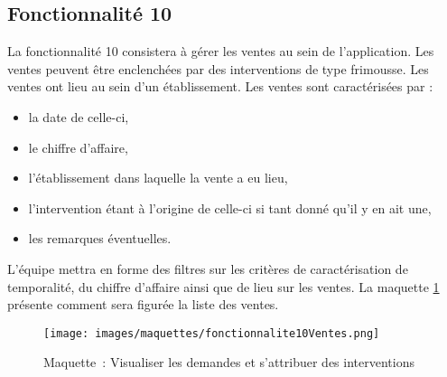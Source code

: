 \subsection{Fonctionnalité 10}

La fonctionnalité 10 consistera à gérer les ventes au sein de l'application.
Les ventes peuvent être enclenchées par des interventions de type frimousse. 
Les ventes ont lieu au sein d'un établissement.
Les ventes sont caractérisées par : 
\begin{itemize}
\item la date de celle-ci,
\item le chiffre d’affaire,
\item l’établissement dans laquelle la vente a eu lieu,
\item l’intervention étant à l’origine de celle-ci si tant donné qu’il y en ait une,
\item les remarques éventuelles.
\end{itemize}

L'équipe \PIC{} mettra en forme des filtres sur les critères de caractérisation de temporalité, du chiffre d'affaire ainsi que de lieu sur les ventes.
La maquette \ref{fonctionnalite10Ventes} présente comment sera figurée la liste des ventes.
 \\

\begin{figure}[H]
	\centering
	\texttt{[image: images/maquettes/fonctionnalite10Ventes.png]}
	 \caption{Maquette~: Visualiser les demandes et s'attribuer des interventions}
	 \label{fonctionnalite10Ventes}
\end{figure}
